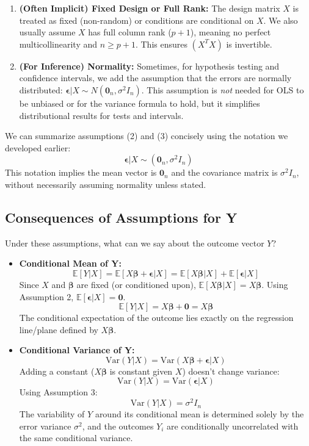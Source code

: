 \documentclass[11pt]{article}
\theoremstyle{definition}
\newcommand{\E}{\mathbb{E}} %
\newcommand{\Var}{\mathrm{Var}} %
\newcommand{\T}{^T} %
\newcommand{\bbeta}{\bm{\beta}} %
\newcommand{\bepsilon}{\bm{\epsilon}} %
\newcommand{\bZero}{\mathbf{0}} %
\begin{document}
\begin{enumerate}
    \item \textbf{(Often Implicit) Fixed Design or Full Rank:} The design matrix $X$ is treated as fixed (non-random) or conditions are conditional on $X$. We also usually assume $X$ has full column rank ($p+1$), meaning no perfect multicollinearity and $n \ge p+1$. This ensures $(X\T X)$ is invertible.
    \item \textbf{(For Inference) Normality:} Sometimes, for hypothesis testing and confidence intervals, we add the assumption that the errors are normally distributed: $\bepsilon | X \sim N(\bZero_n, \sigma^2 I_n)$. This assumption is \textit{not} needed for OLS to be unbiased or for the variance formula to hold, but it simplifies distributional results for tests and intervals.
\end{enumerate}

We can summarize assumptions (2) and (3) concisely using the notation we developed earlier:
\[ \bepsilon | X \sim (\bZero_n, \sigma^2 I_n) \]
This notation implies the mean vector is $\bZero_n$ and the covariance matrix is $\sigma^2 I_n$, without necessarily assuming normality unless stated.

\subsection{Consequences of Assumptions for Y}
\label{subsec:consequences_for_y}

Under these assumptions, what can we say about the outcome vector $Y$?
\begin{itemize}
    \item \textbf{Conditional Mean of Y:}
      \[ \E[Y | X] = \E[X\bbeta + \bepsilon | X] = \E[X\bbeta | X] + \E[\bepsilon | X] \]
      Since $X$ and $\bbeta$ are fixed (or conditioned upon), $\E[X\bbeta | X] = X\bbeta$. Using Assumption 2, $\E[\bepsilon | X] = \bZero$.
      \[ \E[Y | X] = X\bbeta + \bZero = X\bbeta \]
      The conditional expectation of the outcome lies exactly on the regression line/plane defined by $X\bbeta$.

    \item \textbf{Conditional Variance of Y:}
      \[ \Var(Y | X) = \Var(X\bbeta + \bepsilon | X) \]
      Adding a constant ($X\bbeta$ is constant given $X$) doesn't change variance:
      \[ \Var(Y | X) = \Var(\bepsilon | X) \]
      Using Assumption 3:
      \[ \Var(Y | X) = \sigma^2 I_n \]
      The variability of $Y$ around its conditional mean is determined solely by the error variance $\sigma^2$, and the outcomes $Y_i$ are conditionally uncorrelated with the same conditional variance.
\end{itemize}
\end{document}
